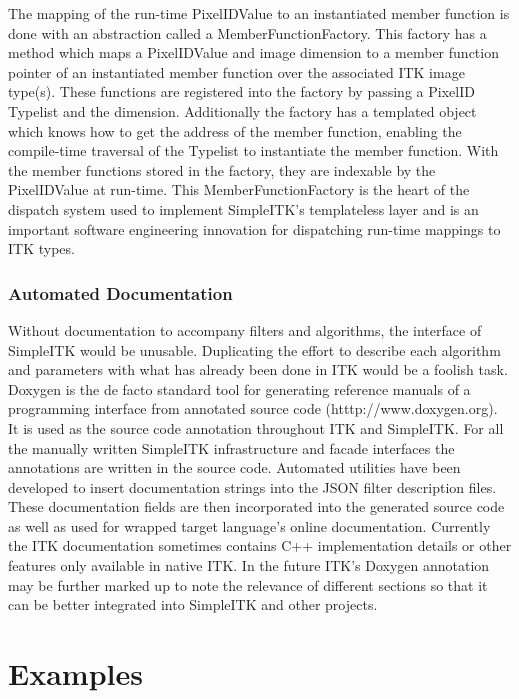 \documentclass{frontiersMED} %
\begin{document}
The mapping of the run-time PixelIDValue to an instantiated member
function is done with an abstraction called a
MemberFunctionFactory. This factory has a method which maps a
PixelIDValue and image dimension to a member function pointer of an
instantiated member function over the associated ITK image
type(s). These functions are registered into the factory by passing a
PixelID Typelist and the dimension. Additionally the factory has a
templated object which knows how to get the address of  the member
function, enabling the compile-time traversal of the Typelist to
instantiate the member function.  With the member functions stored in
the factory, they are indexable by the PixelIDValue at run-time. This
MemberFunctionFactory is the heart of the dispatch system used to
implement SimpleITK’s templateless layer and is an important software
engineering innovation for dispatching run-time mappings to ITK types.

\subsubsection{Automated Documentation}
Without documentation to accompany filters and algorithms, the
interface of SimpleITK would be unusable. Duplicating the effort to
describe each algorithm and parameters with what has already been done
in ITK would be a foolish task. Doxygen is the de facto standard tool
for generating reference manuals of a programming interface from
annotated source code (htttp://www.doxygen.org). It is used as the source code annotation
throughout ITK and SimpleITK. For all the manually written SimpleITK
infrastructure and facade interfaces the annotations are written in
the source code. Automated utilities have been developed to insert
documentation strings into the JSON filter description files. These
documentation fields are then incorporated into the generated source
code as well as used for wrapped target language’s online
documentation. Currently the ITK documentation sometimes contains C++
implementation details or other features only available in native ITK.
In the future ITK’s Doxygen annotation may be further marked up to
note the relevance of different sections so that it can be better
integrated into SimpleITK and other projects.



\section{Examples}
\end{document}
